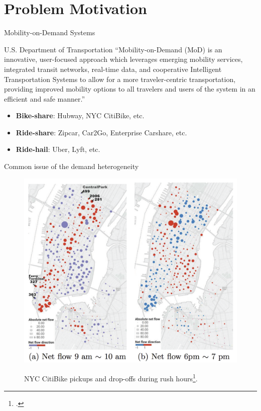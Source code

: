 
\section{Problem Motivation}

    \begin{frame}{Mobility-on-Demand Systems}
    \begin{block}{U.S. Department of Transportation}
    ``Mobility-on-Demand (MoD) is an innovative, user-focused approach which leverages emerging mobility services,
    integrated transit networks, real-time data, and cooperative Intelligent Transportation Systems to allow
    for a more traveler-centric transportation, providing improved mobility options to all travelers and users of the system
    in an efficient and safe manner.''
    \end{block}
    \begin{itemize}
        \pause
        \item{\bf Bike-share}: Hubway, NYC CitiBike, etc.
        \pause
        \item{\bf Ride-share}: Zipcar, Car2Go, Enterprise Carshare, etc.
        \pause
        \item{\bf Ride-hail}: Uber, Lyft, etc.
    \end{itemize}
    
    \end{frame}

    \begin{frame}{Common issue of the demand heterogeneity}
        \begin{figure}
            \centering
            {\includegraphics[scale=0.19]{plots/NYC-flow.png}}
            \caption{NYC CitiBike pickups and drop-offs during rush hours\footcite{Liu:2016:RBS:2939672.2939776}.}
        \end{figure}
    \end{frame}

